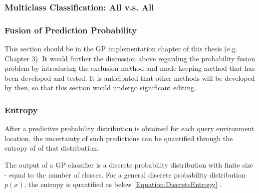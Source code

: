 			\subsubsection{Multiclass Classification: All v.s. All}
			\label{Background:GaussianProcesses:Classification:AVA}
			
			\subsubsection{Fusion of Prediction Probability}
			\label{Background:GaussianProcesses:Classification:ProbabilityFusion}
			
				{\color{BurntOrange} This section should be in the GP implementation chapter of this thesis (e.g. Chapter 3). It would further the discussion above regarding the probability fusion problem by introducing the exclusion method and mode keeping method that has been developed and tested. It is anticipated that other methods will be developed by then, so that this section would undergo significant editing.}
				
				
				
		
			\subsubsection{Entropy}
			\label{Background:GaussianProcesses:Classification:Entropy}
			
				After a predictive probability distribution is obtained for each query environment location, the uncertainty of such predictions can be quantified through the entropy of of that distribution.
				
				The output of a GP classifier is a discrete probability distribution with finite size - equal to the number of classes. For a general discrete probability distribution $p(x)$, the entropy is quantified as below \eqref{Equation:DiscreteEntropy} \cite{ShannonEntropy}.
				
